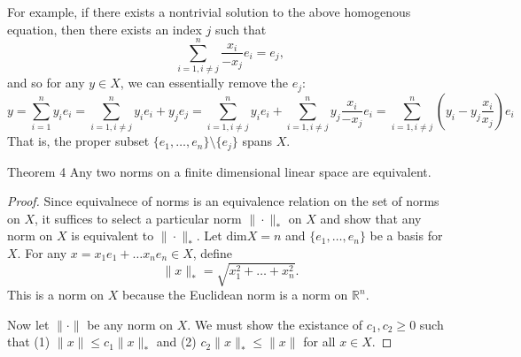 For example, if there exists a nontrivial solution to the above homogenous equation, then there exists an index $j$ such that
\[
    \sum_{i=1,i\neq j}^n \frac{x_i}{-x_j}e_i=e_j,
\]
and so for any $y\in X$, we can essentially remove the $e_j$: 
\[
    y=\sum_{i=1}^ny_ie_i= \sum_{i=1,i\neq j}^ny_ie_i+y_je_j=\sum_{i=1,i\neq j}^ny_ie_i+\sum_{i=1,i\neq j}^n y_j\frac{x_i}{-x_j}e_i=\sum_{i=1,i\neq j}^n(y_i-y_j\frac{x_i}{x_j})e_i
\]
That is, the proper subset $\{e_1,\dots,e_n\}\setminus \{e_j\}$ spans $X$.
\begin{namedthm*}{Theorem 4}
    Any two norms on a finite dimensional linear space are equivalent.
\end{namedthm*}
\begin{proof}
    Since equivalnece of norms is an equivalence relation on the set of norms on $X$, it suffices to select a particular norm $\|\cdot\|_*$ on $X$ and show that any norm on $X$ is equivalent to $\|\cdot\|_*$.
    Let $\text{dim} X=n$ and $\{e_1,\dots,e_n\}$ be a basis for $X$.
    For any $x=x_1e_1+\dots x_ne_n\in X$, define
    \[
        \|x\|_*=\sqrt{x_1^2+\dots+x_n^2}.
    \]
    This is a norm on $X$ because the Euclidean norm is a norm on $\mathbb{R}^n$.

    Now let $\|\cdot\|$ be any norm on $X$.
    We must show the existance of $c_1,c_2\ge0$ such that (1) $ \|x\|\le c_1\|x\|_*$ and (2) $ c_2\|x\|_*\le \|x\|$ for all $x\in X$.
    

\end{proof}
